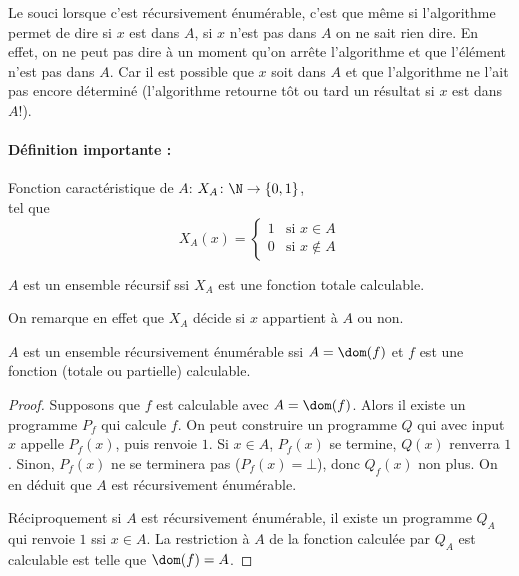 \begin{myrem}
	Le souci lorsque c'est récursivement énumérable,
	c'est que même si l'algorithme permet de dire si $x$ est dans $A$, si $x$
	n'est pas dans $A$ on ne sait rien dire. En effet, on ne peut pas dire à un moment qu'on
	arrête l'algorithme et que l'élément n'est pas dans $A$.
       	Car il est possible que $x$ soit dans $A$ et que l'algorithme ne
	l'ait pas encore déterminé (l'algorithme retourne tôt ou tard un
	résultat si $x$ est dans $A$!).
\end{myrem}

\paragraph{Définition importante :}
\label{par:d_finition_importante}

\begin{mydef}
	Fonction caractéristique de $A$:
	$X_A \colon \N \to \{0,1\}$, \\
	tel que
    \[ X_A(x) =
      \begin{cases}
        1 & \text{si }x \in A \\
        0 & \text{si }x \notin A
      \end{cases}
    \]
\end{mydef}

\begin{myprop}
	$A$ est un ensemble récursif ssi $X_A$ est une fonction totale	calculable.

    On remarque en effet que $X_A$ décide si $x$ appartient à $A$ ou non.
\end{myprop}

\begin{myprop}
	$A$ est un ensemble récursivement énumérable ssi $A = \dom(f)$ et $f$ est une fonction (totale ou partielle) calculable.

    \begin{proof}
      Supposons que $f$ est calculable avec $A=\dom(f)$. Alors
      il existe un programme $P_f$ qui calcule $f$.
      On peut construire un programme $Q$ qui avec input $x$
      appelle $P_f(x)$, puis renvoie $1$.
      Si $x\in A$, $P_f(x)$ se termine, $Q(x)$ renverra $1$. Sinon, $P_f(x)$ ne se terminera pas ($P_f(x) =\bot$), donc $Q_f(x)$ non plus. On en déduit que $A$ est récursivement énumérable.
      
      Réciproquement si $A$ est récursivement énumérable, il existe un programme $Q_A$ qui renvoie $1$ ssi $x\in A$. La restriction à $A$ de la fonction calculée par $Q_A$ est calculable est telle que $\dom(f) = A$.
    \end{proof}
\end{myprop}


